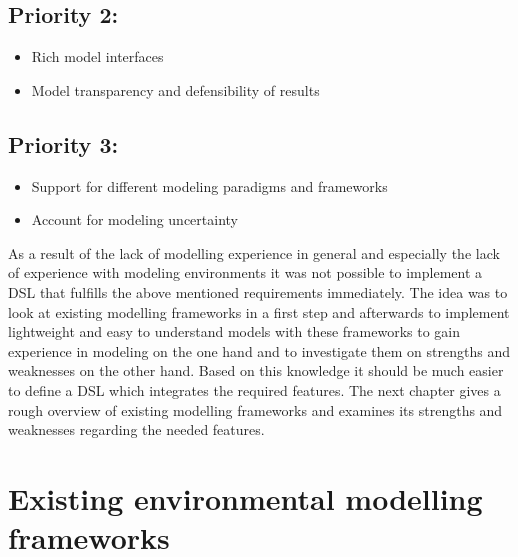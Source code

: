 \subsection*{Priority 2:}
\begin{itemize}
	\item  Rich model interfaces
	\item  Model transparency and defensibility of results
\end{itemize}
\subsection*{Priority 3:}
\begin{itemize}
	\item Support for different modeling paradigms and frameworks
	\item Account for modeling uncertainty
\end{itemize}
\par
As a result of the lack of  modelling experience in general and especially the lack of experience with modeling environments it was not possible to implement a DSL that fulfills the above mentioned requirements immediately. The idea was to look at existing modelling frameworks in a first step and afterwards to implement lightweight and easy to understand models with these frameworks to gain experience in modeling on the one hand and to investigate them on strengths and weaknesses on the other hand. Based on this knowledge it should be much easier to define a DSL which integrates the required features. The next chapter gives a rough overview of existing modelling frameworks and examines its strengths and weaknesses regarding the needed features.

\section{Existing environmental modelling frameworks}













